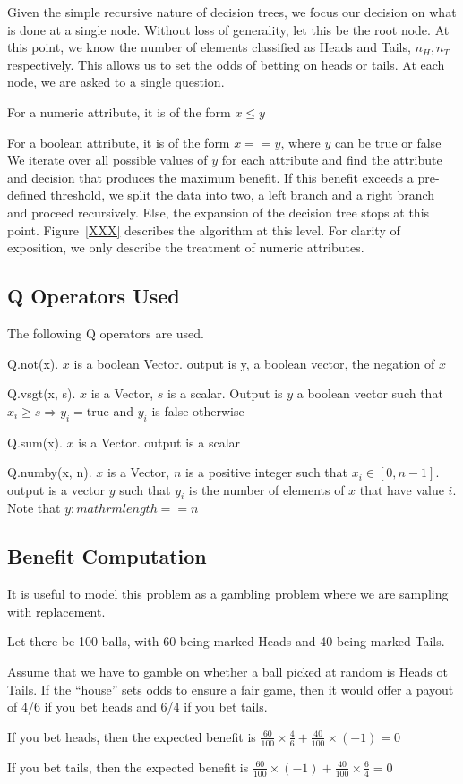 Given the simple recursive nature of decision trees, we focus our 
decision on what is done at a single node. Without loss of generality, 
let this be the root node. At this point, we know the number of elements
classified as Heads and Tails, \(n_H, n_T\) respectively. This allows us to set
the odds of betting on heads or tails. At each node, we are asked to a single
question. 
\bi
\item For a numeric attribute, it is of the form \(x \leq y\)
\item For a boolean attribute, it is of the form \(x == y\), where 
\(y\) can be true or false
\ei
We iterate over all possible values of \(y\) for each attribute and find the
attribute and decision that produces the maximum benefit. If this benefit
exceeds a pre-defined threshold, we split the data into two, a left branch and a
right branch and proceed recursively. Else, the expansion of the decision tree
stops at this point.
Figure~\ref{XXX} describes the algorithm at this level. For clarity of 
exposition, we only describe the treatment of numeric attributes.


\subsection{Q Operators Used}
The following Q operators are used.
\be
\item Q.not(x). \(x\) is a boolean Vector. output is y, a boolean vector, the
negation of \(x\)
\item Q.vsgt(x, s). \(x\) is a Vector, \(s\) is a scalar. Output is \(y\) a
boolean vector such that \(x_i \geq s \Rightarrow y_i = \mathrm{true}\) and
\(y_i\) is false otherwise
\item Q.sum(x). \(x\) is a Vector. output is a scalar
\item Q.numby(x, n). \(x\) is a Vector, \(n\) is a positive integer 
such that \(x_i \in [0, n-1]\). output is a vector \(y\) such that \(y_i\) is
the number of elements of \(x\) that have value \(i\). Note that
\(y:mathrm{length} == n\)
\ee

\subsection{Benefit Computation}
It is useful to model this problem as a gambling problem where we are 
sampling with replacement. 
\bi
\item Let there be 100 balls, with 60  being marked Heads and 40
being marked Tails. 
\item Assume that we have to gamble on whether a ball picked at random is Heads
ot Tails. If the ``house'' sets odds to ensure a fair game, then it would offer
a payout of 4/6 if you bet heads and 6/4 if you bet tails. 
\item If you bet heads, then the expected benefit is 
\(\frac{60}{100} \times \frac{4}{6} + 
\frac{40}{100} \times (-1)  = 0\)
\item If you bet tails, then the expected benefit is 
\(\frac{60}{100} \times (-1) + 
\frac{40}{100} \times \frac{6}{4}  = 0\)
\ei

